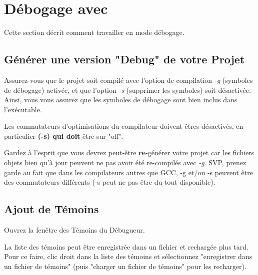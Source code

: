 \section{Débogage avec \codeblocks}\label{sec:debugwithcb}

Cette section décrit comment travailler en mode débogage.

\subsection{Générer une version "Debug" de votre Projet}

Assurez-vous que le projet soit compilé avec l'option de compilation \textit{-g} (symboles de débogage) activée, et que l'option \textit{-s} (supprimer les symboles) soit désactivée. Ainsi, vous vous assurez que les symboles de débogage sont bien inclus dans l'exécutable.

Les commutateurs d'optimisations du compilateur doivent êtres désactivés, en particulier \textbf{(-s) qui doit} être sur "off".

Gardez à l'esprit que vous devrez peut-être \textbf{re}-générer votre projet car les fichiers objets bien qu'à jour peuvent ne pas avoir été re-compilés avec \textit{-g}. SVP, prenez garde au fait que dans les compilateurs autres que GCC, -g et/ou -s peuvent être des commutateurs différents (-s peut ne pas être du tout disponible).


\subsection{Ajout de Témoins}


Ouvrez la fenêtre des Témoins du Débugueur.

La liste des témoins peut être enregistrée dans un fichier et rechargée plus tard. Pour ce faire, clic droit dans la liste des témoins et sélectionnez "enregistrer dans un fichier de témoins" (puis "charger un fichier de témoins" pour les recharger). 


